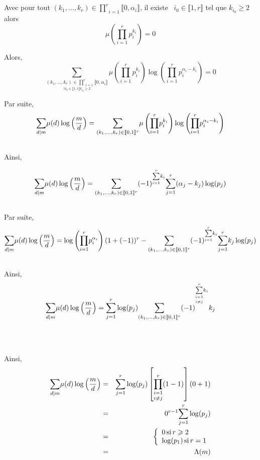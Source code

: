\

\

Avec pour tout $(k_1, \ldots, k_r) \in \underset{i = 1}{\overset{r}{\prod}}
\llbracket 0, \alpha_i \rrbracket$, il existe \ $i_0 \in \llbracket 1, r
\rrbracket$ tel que $k_{i_0} \geqslant 2$ alors
\[ \mu \left( \underset{i = 1}{\overset{r}{\prod}} p^{k_i}_i \right) = 0 \]


Alors,
\[ \underset{\underset{\exists i_0 \in \llbracket 1, r \rrbracket k_{i_0}
   \geqslant 2}{(k_1, \ldots, k_r) \in \underset{i = 1}{\overset{r}{\prod}}
   \llbracket 0, \alpha_i \rrbracket}}{\sum} \mu \left( \underset{i =
   1}{\overset{r}{\prod}} p^{k_i}_i \right) \log \left( \underset{i =
   1}{\overset{r}{\prod}} p^{\alpha_i - k_i}_i \right) = 0 \]


Par suite,
\[ \underset{d |  m}{\sum} \mu (d) \log \left( \frac{m}{d} \right)
   = \underset{\underset{}{(k_1, \ldots, k_r) \in \underset{}{\overset{}{}}
   \llbracket 0, 1 \rrbracket^r}}{\sum} \mu \left( \underset{i =
   1}{\overset{r}{\prod}} p^{k_i}_i \right) \log \left( \underset{i =
   1}{\overset{r}{\prod}} p^{\alpha_i - k_i}_i \right) \]


Ainsi,


\[ \underset{d |  m}{\sum} \mu (d) \log \left( \frac{m}{d} \right) =
   \underset{\underset{}{(k_1, \ldots, k_r) \in \underset{}{\overset{}{}}
   \llbracket 0, 1 \rrbracket^r}}{\sum} (- 1)^{\overset{r}{\underset{i =
   1}{\sum}} k_i} \overset{r}{\underset{j = 1}{\sum}} (\alpha_j - k_j) \log (p
   _j) \]


Par suite,
\[ \underset{d |  m}{\sum} \mu (d) \log \left( \frac{m}{d} \right)
   = \log \left( \underset{i = 1}{\overset{r}{\prod}} p^{\alpha_i}_i \right)
   (1 + (- 1))^r - \underset{\underset{}{(k_1, \ldots, k_r) \in
   \underset{}{\overset{}{}} \llbracket 0, 1 \rrbracket^r}}{\sum} (-
   1)^{\overset{r}{\underset{i = 1}{\sum}} k_i} \overset{r}{\underset{j =
   1}{\sum}} k_j \log (p _j) \]


Ainsi,
\[ \underset{d |  m}{\sum} \mu (d) \log \left( \frac{m}{d} \right) =
   \overset{r}{\underset{j = 1}{\sum}} \log (p _j) \underset{\underset{}{(k_1,
   \ldots, k_r) \in \underset{}{\overset{}{}} \llbracket 0, 1
   \rrbracket^r}}{\sum} (- 1)^{\overset{r}{\underset{}{\underset{i \neq
   j}{\underset{i = 1}{\sum}}}} k_i} k_j \]


\

Ainsi,
\begin{eqnarray*}
  \underset{d |  m}{\sum} \mu (d) \log \left( \frac{m}{d} \right) &
  = & \overset{r}{\underset{j = 1}{\sum}} \log (p _j) \left[ \underset{i \neq
  j}{\underset{i = 1}{\overset{r}{\prod}}} (1 - 1) \right] (0 + 1)\\
  & = & 0^{r - 1} \overset{r}{\underset{j = 1}{\sum}} \log (p _j)\\
  & = & \left\{\begin{array}{l}
    0 \operatorname{si} r \geqslant 2\\
    \log (p_1) \operatorname{si} r = 1
  \end{array}\right.\\
  & = & \Lambda (m)
\end{eqnarray*}


